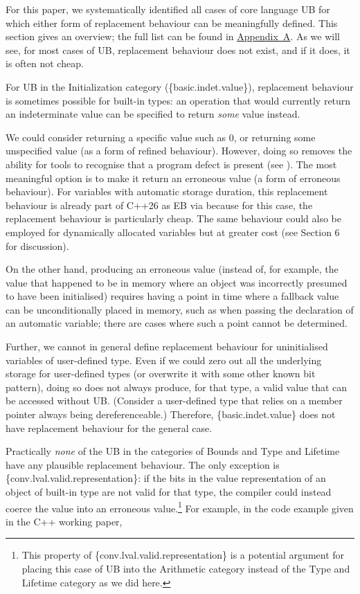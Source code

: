 {For this paper, we systematically identified all cases of core language UB for which either form of replacement behaviour can be meaningfully defined. This section gives an overview; the full list can be found in \hyperref[appendix]{Appendix~A}. As we will see, for most cases of UB, replacement behaviour does not exist, and if it does, it is often not cheap.

For UB in the Initialization category (\{basic.indet.value\}), replacement behaviour is sometimes possible for built-in types: an operation that would currently return an indeterminate value can be specified to return \emph{some} value instead.


We could consider returning a specific value such as 0, or returning some unspecified value (as a form of refined behaviour). However, doing so removes the ability for tools to recognise that a program defect is present (see \cite{P2754R0}). The most meaningful option is to make it return an erroneous value (a form of erroneous behaviour). For variables with automatic storage duration, this replacement behaviour is already part of C++26 as EB via \cite{P2795R5} because for this case, the replacement behaviour is particularly cheap. The same  behaviour could also be employed for dynamically allocated variables but at greater cost (see \cite{P2723R1} Section 6 for discussion).

On the other hand, producing an erroneous value (instead of, for example, the value that happened to be in memory where an object was incorrectly presumed to have been initialised) requires having a point in time where a fallback value can be unconditionally placed in memory, such as when passing the declaration of an automatic variable; there are cases where such a point cannot be determined.

Further, we cannot in general define replacement behaviour for uninitialised variables of user-defined type. Even if we could zero out all the underlying storage for user-defined types (or overwrite it with some other known bit pattern), doing so does not always produce, for that type, a valid value that can be accessed without UB. (Consider a user-defined type that relies on a member pointer always being dereferenceable.) Therefore, \{basic.indet.value\} does not have replacement behaviour for the general case.

Practically \emph{none} of the UB in the categories of Bounds and Type and Lifetime have any plausible replacement behaviour. The only exception is \{conv.lval.valid.representation\}: if the bits in the value representation of an object of built-in type are not valid for that type, the compiler could instead coerce the value into an erroneous value.\footnote{This property of \{conv.lval.valid.representation\} is a potential argument for placing this case of UB into the Arithmetic category instead of the Type and Lifetime category as we did here.} For example, in the code example given in the C++ working paper,

}
